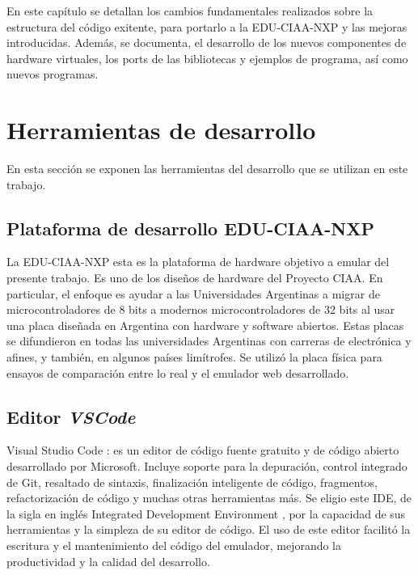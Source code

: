 
En este capítulo se detallan los cambios fundamentales realizados sobre la estructura del código exitente, para portarlo a la EDU-CIAA-NXP y las mejoras introducidas. Además, se documenta, el desarrollo de los nuevos componentes de hardware virtuales, los ports de las bibliotecas y ejemplos de programa, así como nuevos programas.

\section{Herramientas de desarrollo}
\label{sec:Herramientas de trabajo}

En esta sección se exponen las herramientas del desarrollo que se utilizan en este trabajo.

\subsection{Plataforma de desarrollo EDU-CIAA-NXP}
\label{sec:EDU-CIAA-NXP}

La EDU-CIAA-NXP esta es la plataforma de hardware objetivo a emular del presente trabajo. Es uno de los diseños de hardware del Proyecto CIAA. En particular, el enfoque es ayudar a las Universidades Argentinas a migrar de microcontroladores de 8 bits a modernos microcontroladores de 32 bits al usar una placa diseñada en Argentina con hardware y software abiertos. Estas placas se difundieron en todas las universidades Argentinas con carreras de electrónica y afines, y también, en algunos países limítrofes. 
Se utilizó la placa física para ensayos de comparación entre lo real y el emulador web desarrollado.

\subsection{Editor \textit{VSCode}}
\label{sec:gitYAmigos}

Visual Studio Code \citep{VisualStudioCode}: es un editor de código fuente gratuito y de código abierto desarrollado por Microsoft. Incluye soporte para la depuración, control integrado de Git, resaltado de sintaxis, finalización inteligente de código, fragmentos, refactorización de código y muchas otras herramientas más. Se eligio este IDE, de la sigla en inglés Integrated Development Environment \citep{IDE}, por la capacidad de sus herramientas y la simpleza de su editor de código. El uso de este editor facilitó la escritura y el mantenimiento del código del emulador, mejorando la productividad y la calidad del desarrollo.
	
